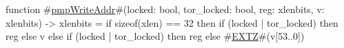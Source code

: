 function #\hyperref[sailRISCVzpmpWriteAddr]{pmpWriteAddr}#(locked: bool, tor_locked: bool, reg: xlenbits, v: xlenbits) -> xlenbits =
  if   sizeof(xlen) == 32
  then { if (locked | tor_locked) then reg else v }
  else { if (locked | tor_locked) then reg else #\hyperref[sailRISCVzEXTZ]{EXTZ}#(v[53..0]) }
